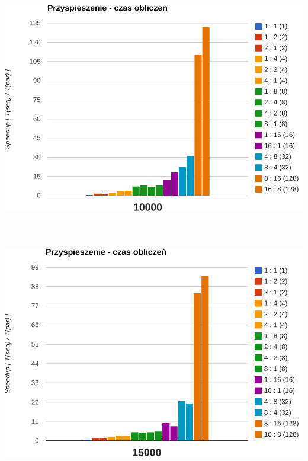 \documentclass[paper=a4, fontsize=11pt]{scrartcl}	%
\numberwithin{equation}{section}		%
\numberwithin{figure}{section}			%
\numberwithin{table}{section}				%
\begin{document}
\includegraphics[width=135mm]{report/comp-speedup-10000.pdf} \\ \ \\ \ \\ \ \\

\includegraphics[width=135mm]{report/comp-speedup-15000.pdf} \\ \ \\ \ \\ \ \\
\end{document}
